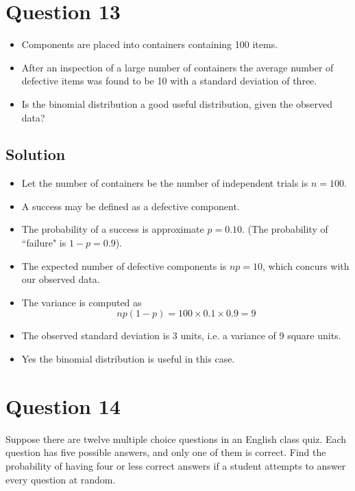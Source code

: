 \documentclass[a4paper,12pt]{article}
\begin{document}
\section*{Question 13}

\begin{itemize}
	\item Components are placed into containers containing 100 items.
	\item After an inspection of a large number of containers the average number of defective items was found to be 10 with a standard deviation of three.
	\item Is the binomial distribution a good useful distribution, given the observed data?
\end{itemize}




\subsection*{Solution}

\begin{itemize}
	\item Let the number of containers be the number of independent trials is $n=100$.
	\item A success may be defined as a defective component.
	\item The probability of a success is approximate $p=0.10$. (The probability of ``failure" is $1-p=0.9$).
	\item The expected number of defective components is $np=10$, which concurs with our observed data.
	\item The variance is computed as \[np(1-p) = 100 \times 0.1 \times 0.9 = 9\]
	\item The observed standard deviation is 3 units, i.e. a variance of 9 square units.
	\item Yes the binomial distribution is useful in this case.
\end{itemize}

\section*{Question 14}

Suppose there are twelve multiple choice questions in an English class quiz. Each question has five possible answers, and only one of them is correct. Find the probability of having four or less correct answers if a student attempts to answer every question at random.
\end{document}
